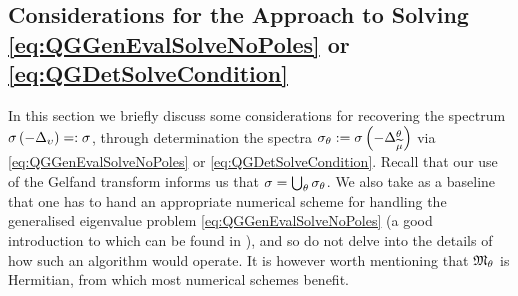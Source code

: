 \subsection{Considerations for the Approach to Solving \eqref{eq:QGGenEvalSolveNoPoles} or \eqref{eq:QGDetSolveCondition}} \label{ssec:ApproachConsiderations}
In this section we briefly discuss some considerations for recovering the spectrum $\sigma\left( -\Delta_{\upsilon} \right)=:\sigma$, through determination the spectra $\sigma_{\theta}:=\sigma\left( -\Delta_{\widetilde{\mu}}^{\theta} \right)$ via \eqref{eq:QGGenEvalSolveNoPoles} or \eqref{eq:QGDetSolveCondition}.
Recall that our use of the Gelfand transform informs us that $\sigma = \bigcup_{\theta}\sigma_{\theta}$.
We also take as a baseline that one has to hand an appropriate numerical scheme for handling the generalised eigenvalue problem \eqref{eq:QGGenEvalSolveNoPoles} (a good introduction to which can be found in \cite{guttel2017nonlinear}), and so do not delve into the details of how such an algorithm would operate.
It is however worth mentioning that $\mathfrak{M}_\theta$ is Hermitian, from which most numerical schemes benefit.

